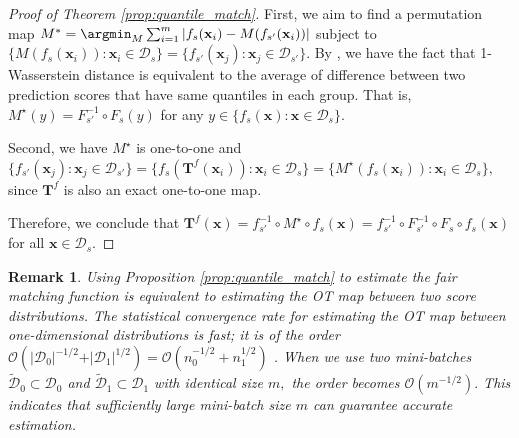 \documentclass[10pt]{article} %
\newtheorem{remark}[theorem]{Remark}
\begin{document}
    \begin{proof}[Proof of Theorem \ref{prop:quantile_match}]
        First, we aim to find a permutation map $M^{*} = \argmin_{M} \sum_{i=1}^{m} \vert f_{s}(\mathbf{x}_{i}) - M ( f_{s'}(\mathbf{x}_{i}) ) \vert $
        subject to $\{ M(f_{s}(\mathbf{x}_{i})): \mathbf{x}_{i} \in {\mathcal{D}}_{s} \} = \{ f_{s'}(\mathbf{x}_{j}): \mathbf{x}_{j} \in {\mathcal{D}}_{s'} \}.$
        By \citet{rachev1998mass, NEURIPS2020_51cdbd26, pmlr-v115-jiang20a}, we have the fact that 1-Wasserstein distance is equivalent to the average of difference between two prediction scores that have same quantiles in each group.
        That is, $ M^{\star}(y) = F_{s'}^{-1} \circ F_{s} (y) $ for any $y \in \{ f_{s}(\mathbf{x}) : \mathbf{x} \in {\mathcal{D}}_{s} \}.$
        
        Second, we have $M^{\star}$ is one-to-one and $ \{ f_{s'}(\mathbf{x}_{j}): \mathbf{x}_{j} \in {\mathcal{D}}_{s'} \} = \{ f_{s} ( \mathbf{T}^{f}(\mathbf{x}_{i}) ) : \mathbf{x}_{i} \in {\mathcal{D}}_{s} \} = \{ M^{\star}(f_{s}(\mathbf{x}_{i})): \mathbf{x}_{i} \in {\mathcal{D}}_{s} \}, $ since $\mathbf{T}^{f}$ is also an exact one-to-one map.
        
        Therefore, we conclude that $ \mathbf{T}^{f}(\mathbf{x}) = f_{s'}^{-1} \circ M^{\star} \circ f_{s} (\mathbf{x}) = f_{s'}^{-1} \circ F_{s'}^{-1} \circ F_{s} \circ f_{s}(\mathbf{x}) $ for all $\mathbf{x} \in {\mathcal{D}}_{s}.$
    \end{proof}
    
    \begin{remark}\label{rmk:prop:quantile_match}
        Using Proposition \ref{prop:quantile_match} to estimate the {fair matching function} is equivalent to estimating the OT map between two score distributions.
        The statistical convergence rate for estimating the OT map between one-dimensional distributions is fast; it is of the order 
        $
        \mathcal{O}(\vert {\mathcal{D}}_{0} \vert^{-1/2} + \vert {\mathcal{D}}_{1} \vert^{1/2}) 
        = \mathcal{O}(n_{0}^{-1/2} + n_{1}^{1/2})
        $ 
        \citep{10.5555/3495724.3495914, Deb2021RatesOE, 10.1214/20-AOS1997}.
        When we use two mini-batches $\tilde{\mathcal{D}}_{0} \subset \mathcal{D}_{0}$ and $\tilde{\mathcal{D}}_{1} \subset \mathcal{D}_{1}$ with identical size $m,$ the order becomes $\mathcal{O}(m^{-1/2}).$
        This indicates that sufficiently large mini-batch size $m$ can guarantee accurate estimation.
    \end{remark}
\end{document}
